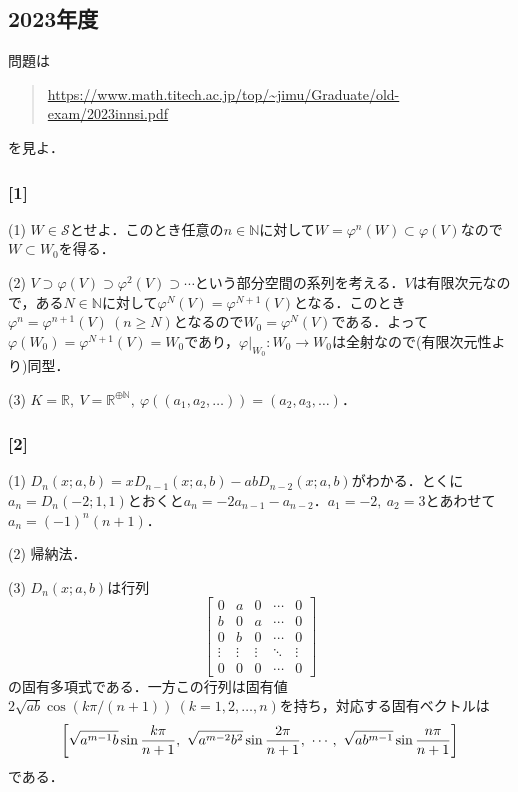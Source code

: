 \documentclass[a4j]{ltjsarticle}
\newcommand{\Rset}{\mathbb{R}}
\newcommand{\Nset}{\mathbb{N}}
\newcommand{\1}{\mathbbm{1}}
\numberwithin{equation}{section}
\theoremstyle{definition}
\begin{document}
\subsection{2023年度}
問題は
\begin{quote}
    \url{https://www.math.titech.ac.jp/top/~jimu/Graduate/old-exam/2023innsi.pdf}
\end{quote}
を見よ．
\subsubsection*{[1]}
(1) $W\in \mathcal{S}$とせよ．このとき任意の$n\in\Nset$に対して$W=\varphi^n(W)\subset \varphi(V)$なので$W\subset W_0$を得る．

(2) $V\supset \varphi(V)\supset \varphi^2(V)\supset\cdots$という部分空間の系列を考える．$V$は有限次元なので，ある$N\in\Nset$に対して$\varphi^N(V)=\varphi^{N+1}(V)$となる．このとき$\varphi^{n}=\varphi^{n+1}(V)\ (n\geq N)$となるので$W_0=\varphi^N(V)$である．よって$\varphi(W_0)=\varphi^{N+1}(V)=W_0$であり，$\varphi|_{W_0}\colon W_0\to W_0$は全射なので(有限次元性より)同型．

(3) $K=\Rset,\ V=\Rset^{\oplus\Nset},\ \varphi((a_1,a_2,\ldots))=(a_2,a_3,\ldots)$．

\subsubsection*{[2]}
(1) $D_n(x;a,b)=xD_{n-1}(x;a,b)-abD_{n-2}(x;a,b)$がわかる．とくに$a_n=D_n(-2;1,1)$とおくと$a_n=-2a_{n-1}-a_{n-2}$．$a_1=-2,\ a_2=3$とあわせて$a_n=(-1)^{n}(n+1)$．

(2) 帰納法．

(3) $D_n(x;a,b)$は行列
\begin{equation}
    \begin{bmatrix}
        0 & a & 0 & \cdots & 0 \\
        b & 0 & a & \cdots & 0 \\
        0 & b & 0 & \cdots & 0 \\
        \vdots & \vdots & \vdots & \ddots & \vdots \\
        0 & 0 & 0 & \cdots & 0
    \end{bmatrix}
\end{equation}
の固有多項式である．一方この行列は固有値$2\sqrt{ab}\cos(k\pi/(n+1))\ (k=1,2,\ldots,n)$を持ち，対応する固有ベクトルは
\begin{equation}
    \qty[\sqrt{a^{m-1}b}\sin\frac{k\pi}{n+1},\ \sqrt{a^{m-2}b^2}\sin\frac{2\pi}{n+1},\ \cdots,\ \sqrt{ab^{m-1}}\sin \frac{n\pi}{n+1}]
\end{equation}
である．
\end{document}
